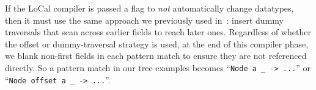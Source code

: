 \documentclass[showabstract,showacknowledgments,showpreface,showdedication]{iuphd}
\theoremstyle{nonumberplain}
\newcommand{\il}[1]{\lstinline[style=inline,mathescape=true];#1;}
\begin{document}
If the LoCal compiler is passed a flag to {\em not} automatically change
datatypes, then it must use the same approach we previously used in~\cite{ecoop17-gibbon}:
insert {dummy traversals} that scan across earlier
fields to reach later ones.
%
Regardless of whether the offset or dummy-traversal strategy is used,
%
at the end of this compiler phase, we blank non-first fields in
each pattern match to ensure they are not referenced directly.
So a pattern match in our tree examples becomes
 ``\il{Node a _ -> ...}'' or   ``\il{Node offset a _ -> ...}''.





\end{document}
